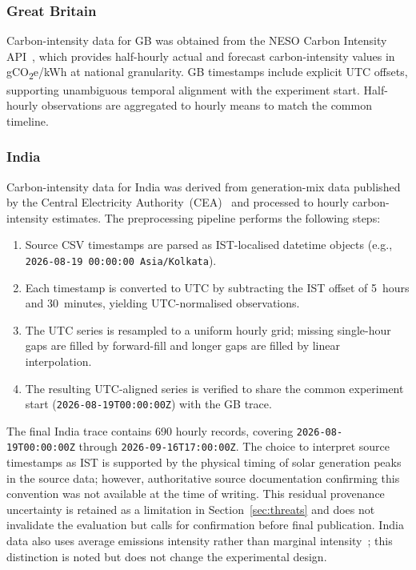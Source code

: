 \documentclass[conference]{IEEEtran}
\begin{document}
\subsubsection{Great Britain}

Carbon-intensity data for GB was obtained from the NESO Carbon Intensity
API~\cite{neso2024api}, which provides half-hourly actual and forecast
carbon-intensity values in gCO\textsubscript{2}e/kWh at national granularity.
GB timestamps include explicit UTC offsets, supporting unambiguous temporal
alignment with the experiment start. Half-hourly observations are aggregated
to hourly means to match the common timeline.

\subsubsection{India}
\label{subsubsec:india-data}

Carbon-intensity data for India was derived from generation-mix data published
by the Central Electricity Authority~(CEA)~\cite{cea2024,ceai2023general} and
processed to hourly carbon-intensity estimates. The preprocessing pipeline
performs the following steps:

\begin{enumerate}
  \item Source CSV timestamps are parsed as IST-localised datetime objects
        (e.g., \texttt{2026-08-19~00:00:00~Asia/Kolkata}).
  \item Each timestamp is converted to UTC by subtracting the IST offset of
        5~hours and 30~minutes, yielding UTC-normalised observations.
  \item The UTC series is resampled to a uniform hourly grid; missing
        single-hour gaps are filled by forward-fill and longer gaps are
        filled by linear interpolation.
  \item The resulting UTC-aligned series is verified to share the common
        experiment start (\texttt{2026-08-19T00:00:00Z}) with the GB trace.
\end{enumerate}

The final India trace contains 690 hourly records, covering
\texttt{2026-08-19T00:00:00Z} through \texttt{2026-09-16T17:00:00Z}.
The choice to interpret source timestamps as IST is supported by the physical
timing of solar generation peaks in the source data; however, authoritative
source documentation confirming this convention was not available at the time
of writing. This residual provenance uncertainty is retained as a limitation
in Section~\ref{sec:threats} and does not invalidate the evaluation but calls
for confirmation before final publication. India data also uses average
emissions intensity rather than marginal intensity~\cite{siler2012should};
this distinction is noted but does not change the experimental design.
\end{document}

